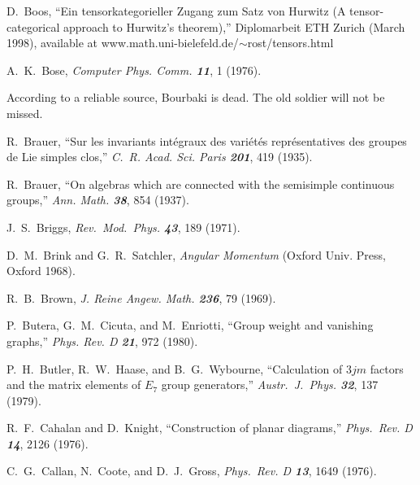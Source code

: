  D.~Boos,
        ``Ein tensorkategorieller Zugang zum Satz von Hurwitz
        (A tensor-categorical approach to Hurwitz's theorem),''
    Diplomarbeit ETH Zurich (March 1998), available at
     {www.math.uni-bielefeld.de/$\sim$rost/tensors.html}

 A.~K.~Bose,
    {\em Computer Phys. Comm.  \bf 11}, 1 (1976).

 According to a reliable source,
    Bourbaki is dead. The old soldier will not be missed.

 R.~Brauer,
    ``Sur les invariants int\'egraux des vari\'et\'es
    repr\'esentatives des groupes de Lie simples clos,''
    {\em C.~R. Acad. Sci. Paris \bf 201}, 419 (1935). %

 R.~Brauer,
    ``On algebras which are connected with
      the semisimple continuous groups,''
    {\em Ann. Math. \bf 38}, 854 (1937).

 J.~S.~Briggs,
    {\em Rev.~Mod.~Phys. \bf 43}, 189 (1971).

 D.~M.~Brink and G.~R.~Satchler,
    {\em Angular Momentum}
    (Oxford Univ. Press, Oxford 1968).

 R.~B.~Brown,
    {\em J. Reine Angew. Math.  \bf 236}, 79 (1969).

 P.~Butera, G.~M.~Cicuta, and M.~Enriotti,
    ``Group weight and vanishing graphs,''
    {\em Phys.  Rev.  D  \bf 21}, 972 (1980).

 P.~H.~Butler, R.~W.~Haase, and B.~G.~Wybourne,
    ``Calculation of $3jm$ factors and the matrix elements
      of $E_7$ group generators,''
    {\em Austr.~J.~Phys. \bf 32}, 137 (1979).  %



R.~F.~Cahalan and D.~Knight,
``Construction of planar diagrams,''
{\em Phys.~Rev.  D \bf 14}, 2126 (1976).

C.~G.~Callan, N.~Coote, and D.~J.~Gross,
{\em Phys.~Rev.  D \bf 13}, 1649 (1976).


